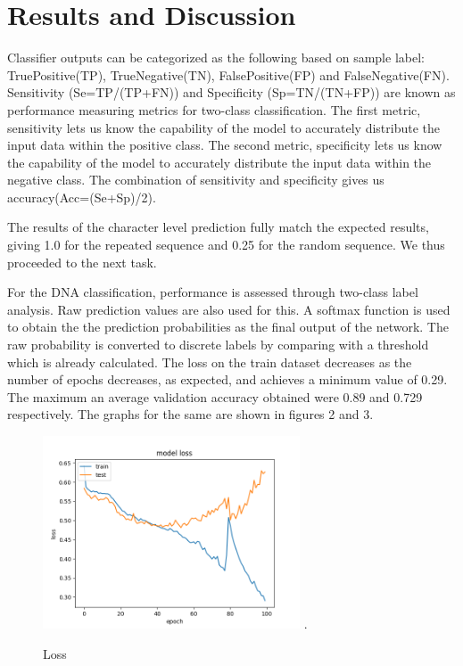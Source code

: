 \documentclass[conference]{IEEEtran}
\begin{document}
\section{Results and Discussion}
Classifier outputs can be categorized as the following based on sample label: TruePositive(TP), TrueNegative(TN), FalsePositive(FP) and FalseNegative(FN).\newline
Sensitivity (Se=TP/(TP+FN)) and Specificity (Sp=TN/(TN+FP)) are known as performance measuring metrics for two-class classification. The first metric, sensitivity lets us know the capability of the model to accurately distribute the input data within the positive class. The second metric, specificity lets us know the capability of the model to accurately distribute the input data within the negative class. The combination of sensitivity and specificity gives us accuracy(Acc=(Se+Sp)/2).
\newline

The results of the character level prediction fully match the expected results, giving 1.0 for the repeated sequence and 0.25 for the random sequence. We thus proceeded to the next task.
\newline

For the DNA classification, performance is assessed through two-class label analysis. Raw prediction values are also used for this. A softmax function is used to obtain the the prediction probabilities as the final output of the network. The raw probability is converted to discrete labels by comparing with a threshold which is already calculated. The loss on the train dataset decreases as the number of epochs decreases, as expected, and achieves a minimum value of 0.29. The maximum an average validation accuracy obtained were 0.89 and 0.729 respectively.
The graphs for the same are shown in figures 2 and 3.
\newline


\begin{figure}[h]
\centering
\includegraphics[width=3in]{loss.png}
\DeclareGraphicsExtensions.
\caption{Loss}
\label{fig_sim}
\end{figure}
\end{document}
